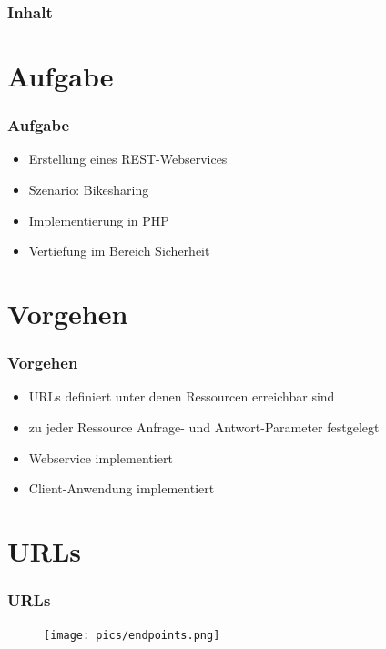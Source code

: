 \begin{frame}
	\frametitle*{Inhalt}
	\tableofcontents
\end{frame}

\section{Aufgabe}
\begin{frame}
	\frametitle*{Aufgabe}
	\begin{itemize}
		\item Erstellung eines REST-Webservices
		\item Szenario: Bikesharing
		\item Implementierung in PHP
		\item Vertiefung im Bereich Sicherheit
	\end{itemize}
\end{frame}

\section{Vorgehen}
\begin{frame}
	\frametitle*{Vorgehen}
	\begin{itemize}
		\item URLs definiert unter denen Ressourcen erreichbar sind
		\item zu jeder Ressource Anfrage- und Antwort-Parameter festgelegt
		\item Webservice implementiert
		\item Client-Anwendung implementiert
	\end{itemize}
\end{frame}

\section{URLs}
\begin{frame}
	\frametitle*{URLs}
	\begin{figure}
		\centering
		\texttt{[image: pics/endpoints.png]}
	\end{figure}
\end{frame}

